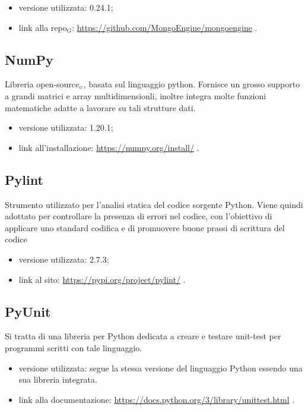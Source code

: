 \begin{itemize}
  \item versione utilizzata: 0.24.1;
  \item link alla repo$_G$: \url{https://github.com/MongoEngine/mongoengine} .
\end{itemize}

\subsection{NumPy}\label{LibrerieNumpy}
Libreria open-source$_{\scaleto{G}{3pt}}$, basata sul linguaggio python.
Fornisce un grosso supporto a grandi matrici e array multidimensionli, inoltre integra molte funzioni matematiche adatte a lavorare su tali strutture dati.

\begin{itemize}
  \item versione utilizzata: 1.20.1;
  \item link all'installazione: \url{https://numpy.org/install/} .
\end{itemize}

\subsection{Pylint}\label{LibreriePylint}
Strumento utilizzato per l’analisi statica del codice sorgente Python. Viene quindi adottato per controllare la presenza di errori nel codice, con l’obiettivo di applicare uno standard codifica e di promuovere buone prassi di scrittura del codice

\begin{itemize}
  \item versione utilizzata: 2.7.3;
  \item link al sito: \url{https://pypi.org/project/pylint/} .
\end{itemize}

\subsection{PyUnit}\label{LibreriePyUnit}
Si tratta di una libreria per Python dedicata a creare e testare unit-test per programmi scritti con tale linguaggio.

\begin{itemize}
  \item versione utilizzata: segue la stessa versione del linguaggio Python essendo una sua libreria integrata.
  \item link  alla documentazione: \url{https://docs.python.org/3/library/unittest.html} .
\end{itemize}


